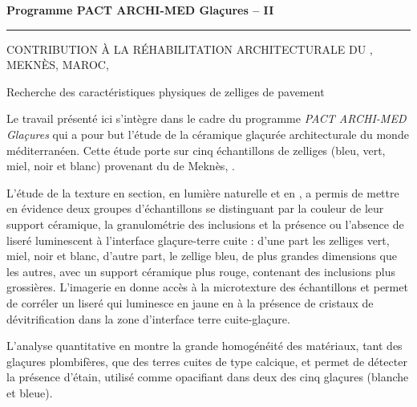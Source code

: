 

{
\large
\begin{center}
\bfseries\Large
Programme PACT ARCHI-MED Glaçures -- II

\vspace*{-0.75\baselineskip}

\rule{.5\textwidth}{1pt}

\bigskip

\MakeUppercase{Contribution à la réhabilitation architecturale du 
\PaM, Meknès, Maroc, }

\bigskip

Recherche des caractéristiques physiques de zelliges de pavement
\end{center}

\vfill

Le travail présenté ici s'intègre dans le cadre du programme 
\emph{PACT ARCHI-MED Glaçures} qui a pour but l'étude de la céramique 
glaçurée architecturale du monde méditerranéen. Cette étude porte sur 
cinq échantillons de zelliges (bleu, vert, miel, noir et blanc) 
provenant du \PaM de Meknès, .

L'étude de la texture en section, en lumière naturelle et en \CL, 
a permis de mettre en évidence deux groupes d'échantillons se 
distinguant par la couleur de leur support céramique, la granulométrie 
des inclusions et la présence ou l'absence de liseré luminescent à 
l'interface glaçure-terre cuite : d'une part les zelliges vert, miel, 
noir et blanc, d'autre part, le zellige bleu, de plus grandes 
dimensions que les autres, avec un support céramique plus rouge, 
contenant des inclusions plus grossières. L'imagerie en \MEB[ie] donne 
accès à la microtexture des échantillons et permet de corréler un 
liseré qui luminesce en jaune en \CL à la présence de cristaux de 
dévitrification dans la zone d'interface terre cuite-glaçure.

L'analyse quantitative en \EDS montre la grande homogénéité des 
matériaux, tant des glaçures plombifères, que des terres cuites de 
type calcique, et permet de détecter la présence d'étain, utilisé 
comme opacifiant dans deux des cinq glaçures (blanche et bleue).

}
